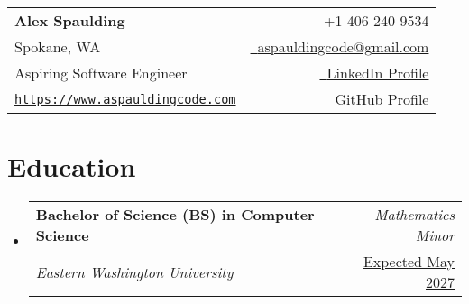\documentclass[a4paper,11pt]{article}
\makeatletter
\newcommand{\resumeSubheading}[4]{
\vspace{0.5mm}\item
    \begin{tabular*}{0.98\textwidth}[t]{l@{\extracolsep{\fill}}r}
        \textbf{#1} & \textit{\footnotesize{#4}} \\
        \textit{\footnotesize{#3}} &  \underline{\footnotesize{#2}}\\
    \end{tabular*}
    \vspace{-2.4mm}
}
\newcommand{\resumeSubHeadingListStart}{\begin{itemize}[leftmargin=*,labelsep=0mm]}
\newcommand{\resumeSubHeadingListEnd}{\end{itemize}\vspace{2mm}}
\newcommand{\name}{Alex Spaulding} %
\newcommand{\course}{Aspiring Software Engineer} %
\newcommand{\roll}{Spokane, WA} %
\newcommand{\phone}{406-240-9534} %
\newcommand{\emaila}{aspauldingcode@gmail.com} %
\makeatother
\begin{document}
\selectfont

{
\begin{tabularx}{\linewidth}{L r} \\
  \textbf{\Large \name} & {\raisebox{0.0\height}{\footnotesize \faPhone}\ +1-\phone}\\
  {\roll } & \href{mailto:\emaila}{\raisebox{0.0\height}{\footnotesize \faEnvelope}\ {\emaila}} \\
  \course & \href{https://linkedin.com/in/aspauldingcode}{\raisebox{0.0\height}{\footnotesize \faLinkedin}\ {LinkedIn Profile}} \\
  \href{https://www.aspauldingcode.com/}{\raisebox{0.0\height}{\footnotesize \faGlobe} {\texttt{https://www.aspauldingcode.com}}} & \href{https://github.com/aspauldingcode}{\raisebox{0.0\height}{\footnotesize \faGithub} {GitHub Profile}} \\
\end{tabularx}
}

\section{\textbf{Education}}
  \resumeSubHeadingListStart
    \resumeSubheading
      {Bachelor of Science (BS) in Computer Science}{Expected May 2027}
      {Eastern Washington University}{Mathematics Minor}
  \resumeSubHeadingListEnd
\vspace{-5.5mm}

\end{document}
